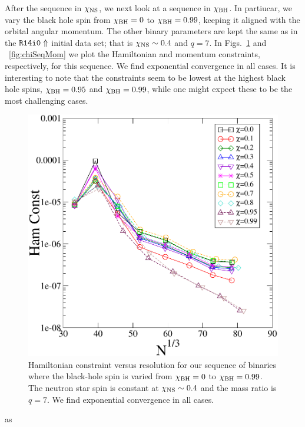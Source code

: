 After the sequence in $\chi_{\rm NS}$, we next look at a sequence in
$\chi_{\rm BH}$. In partiucar, we vary the black hole spin from
$\chi_{\rm BH}=0$ to $\chi_{\rm BH}=0.99$, keeping it aligned with the orbital angular
momentum.
 The other binary parameters are kept the same
as in the ${\tt R14i0\Uparrow}$ initial data set; that is $\chi_{\rm
  NS}\sim0.4$ and $q=7$. In Figs.~\ref{fig:chiSeqHam} and
~\ref{fig:chiSeqMom} we plot the Hamiltonian and momentum constraints,
respectively, for this sequence. We find exponential convergence in
all cases. It is interesting to note that the constraints seem to be
lowest at the highest black hole spins, $\chi_{\rm BH}=0.95$ and
$\chi_{\rm BH}=0.99$, while one might expect these to be the most
challenging cases.

\begin{figure}
\includegraphics[width=0.95\columnwidth]{chap4/chiSeqHam}
\caption[Hamiltonian constraint for the sequence in $\chi_{\rm BH}$.]{\label{fig:chiSeqHam}Hamiltonian constraint versus
  resolution for our sequence of binaries where the black-hole spin is
  varied from $\chi_{\rm BH}=0$ to $\chi_{\rm BH}=0.99$. The neutron star spin is constant at $\chi_{\rm NS}\sim 0.4$ and the mass ratio is $q=7$. We find exponential convergence in all cases.}
\end{figure}as

